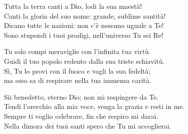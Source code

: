 
\strofa Tutta la terra canti a Dio, lodi la sua maestà!\\
Canti la gloria del suo nome: grande, sublime santità!\\
Dicano tutte le nazioni: non c'è nessuno uguale a Te!\\
Sono stupendi i tuoi prodigi, nell'universo Tu sei Re!

\spazio

\strofa Tu solo compi meraviglie con l'infinita tua virtù.\\
Guidi il tuo popolo redento dalla sua triste schiavitù.\\
Sì, Tu lo provi con il fuoco e vagli la sua fedeltà;\\
ma esso sa di respirare nella tua immensa carità.

\spazio

\strofa Sii benedetto, eterno Dio; non mi respingere da Te.\\
Tendi l'orecchio alla mia voce, venga la grazia e resti in me.\\
Sempre ti voglio celebrare, fin che respiro mi darai.\\
Nella dimora dei tuoi santi spero che Tu mi accoglierai.
